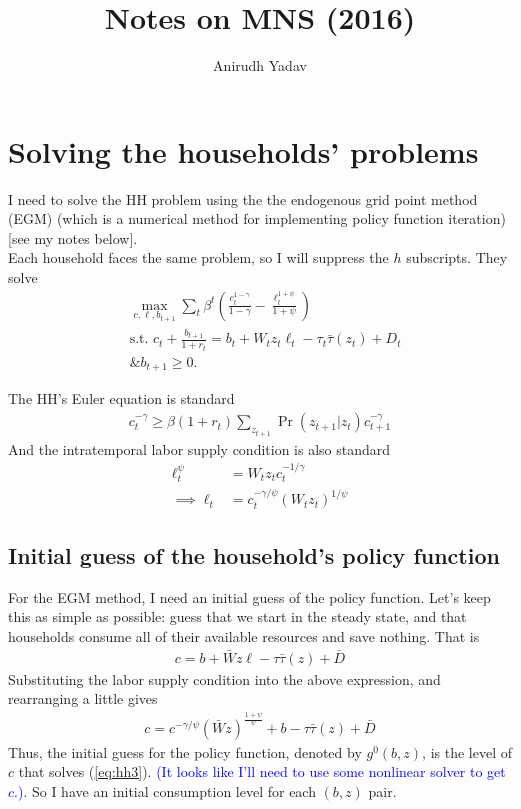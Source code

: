 \documentclass[12pt]{article}
\title{Notes on MNS (2016)}
\author{Anirudh Yadav}
\begin{document}
\maketitle


\section{Solving the households' problems}
I need to solve the HH problem using the the endogenous grid point method (EGM) (which is a numerical method for implementing policy function iteration) [see my notes below].\\

Each household faces the same problem, so I will suppress the $h$ subscripts. They solve
\begin{align*}
&\max_{c,\ell, b_{t+1}} \sum_t \beta^t \left(\frac{c_t^{1-\gamma}}{1-\gamma} - \frac{\ell_t^{1+\psi}}{1+\psi}\right)\\
&\text{s.t. } c_t + \frac{b_{t+1}}{1+r_t} = b_t + W_tz_t\ell_t - \tau_t\bar\tau(z_t) +D_t\\
&\text{\& } b_{t+1} \geq 0.
\end{align*}

The HH's Euler equation is standard
\begin{align}
c_t^{-\gamma} \geq \beta(1+r_t) \sum_{z_{t+1}}\Pr(z_{t+1}|z_t)c_{t+1}^{-\gamma}  \label{eq:hh1}
\end{align}
And the intratemporal labor supply condition is also standard
\begin{align}
\ell_t^\psi &= W_tz_tc_t^{-1/\gamma} \label{eq:hh2}\\
\implies  \ell_t&=c_t^{-\gamma/\psi}(W_tz_t)^{1/\psi}
\end{align}

\subsection{Initial guess of the household's policy function}
For the EGM method, I need an initial guess of the policy function. Let's keep this as simple as possible: guess that we start in the steady state, and that households consume all of their available resources and save nothing. That is
\begin{align*}
c =  b + \bar Wz\ell - \tau\bar\tau(z) +\bar D
\end{align*}
Substituting the labor supply condition into the above expression, and rearranging a little gives
\begin{align}
c = c^{-\gamma/\psi}(\bar Wz)^{\frac{1+\psi}{\psi}}+ b - \tau\bar\tau(z) +\bar D \label{eq:hh3}
\end{align}
Thus, the initial guess for the policy function, denoted by $g^0(b,z)$, is the level of $c$ that solves (\ref{eq:hh3}). \textcolor{blue}{(It looks like I'll need to use some nonlinear solver to get $c$.).} So I have an initial consumption level for each $(b,z)$ pair.
\end{document}

